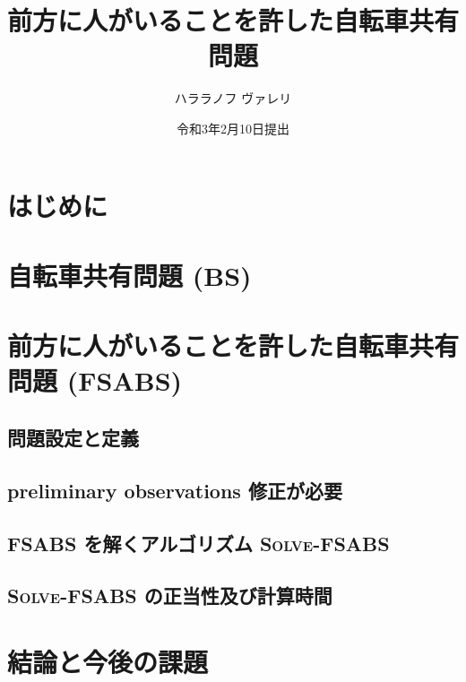 \documentclass[12pt,epsf]{jreport}
\title{前方に人がいることを許した自転車共有問題}
\author{ハララノフ ヴァレリ}
\affiliation{工学部情報工学科}
\date{令和3年2月10日提出}
\begin{document}
\maketitle

\chapter{はじめに}

\chapter{自転車共有問題 (BS)}\label{section:bs}

\chapter{前方に人がいることを許した自転車共有問題 (FSABS) }\label{section:fsabs}
\section{問題設定と定義}

\section{preliminary observations {\color{red}修正が必要}}

\section{FSABS を解くアルゴリズム \textsc{Solve-FSABS}}

\section{\textsc{Solve-FSABS} の正当性及び計算時間}

\chapter{結論と今後の課題}\label{section:conclusion}


\renewcommand{\refname}{参考文献}
\nocite{*}
\printbibliography

\end{document}
